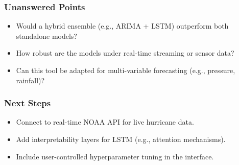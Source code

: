 \subsubsection{Unanswered Points}
\begin{itemize}
	\item Would a hybrid ensemble (e.g., ARIMA + LSTM) outperform both standalone models?
	\item How robust are the models under real-time streaming or sensor data?
	\item Can this tool be adapted for multi-variable forecasting (e.g., pressure, rainfall)?
\end{itemize}

\subsubsection{Next Steps}
\begin{itemize}
	\item Connect to real-time NOAA API for live hurricane data.
	\item Add interpretability layers for LSTM (e.g., attention mechanisms).
	\item Include user-controlled hyperparameter tuning in the interface.
\end{itemize}
